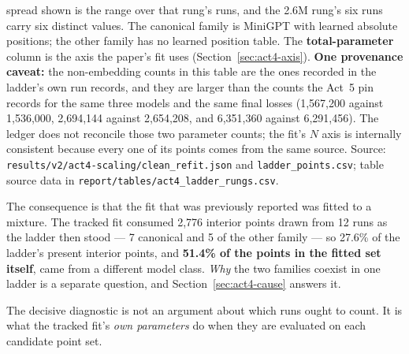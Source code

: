 \documentclass[11pt,a4paper]{article}
\begin{document}
\begin{table}[H]
{spread shown is the range over that rung's runs, and the 2.6M rung's six runs
carry six distinct values. The canonical family is MiniGPT with learned
absolute positions; the other family has no learned position table. The
\textbf{total-parameter} column is the axis the paper's fit uses
(Section~\ref{sec:act4-axis}). \textbf{One provenance caveat:} the
non-embedding counts in this table are the ones recorded in the ladder's own
run records, and they are larger than the counts the Act~5 pin records for
the same three models and the same final losses (1,567,200 against 1,536,000,
2,694,144 against 2,654,208, and 6,351,360 against 6,291,456). The ledger
does not reconcile those two parameter counts; the fit's $N$ axis is
internally consistent because every one of its points comes from the same
source. Source: \texttt{results/v2/act4-scaling/clean\_refit.json} and
\texttt{ladder\_points.csv}; table source data in
\texttt{report/tables/act4\_ladder\_rungs.csv}.}
\label{tab:act4-rungs}
\end{table}

The consequence is that the fit that was previously reported was fitted to a
mixture. The tracked fit consumed 2,776 interior points drawn from 12 runs as
the ladder then stood --- 7 canonical and 5 of the other family --- so 27.6\%
of the ladder's present interior points, and \textbf{51.4\% of the points in
the fitted set itself}, came from a different model class. \emph{Why} the two families coexist in one
ladder is a separate question, and Section~\ref{sec:act4-cause} answers it.

The decisive diagnostic is not an argument about which runs ought to count. It
is what the tracked fit's \emph{own parameters} do when they are evaluated on
each candidate point set. %
\end{document}
